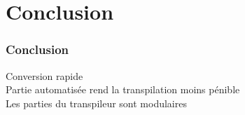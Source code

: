\section{Conclusion}


\begin{frame}
    \frametitle{Conclusion\esp}

    \point Conversion rapide\\
    \point Partie automatisée rend la transpilation moins pénible\\
    \point Les parties du transpileur sont modulaires 

\end{frame}